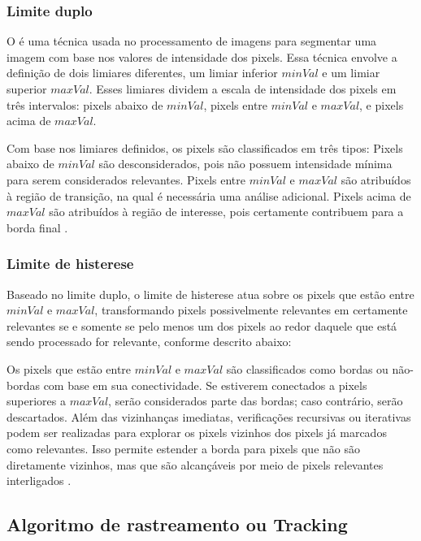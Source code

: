 \subsubsection[Limite duplo]{Limite duplo}

O  é uma técnica usada no processamento de imagens para segmentar uma imagem com base nos valores de intensidade dos pixels. Essa técnica envolve a definição de dois limiares diferentes, um limiar inferior $minVal$ e um limiar superior $maxVal$. Esses limiares dividem a escala de intensidade dos pixels em três intervalos: pixels abaixo de $minVal$, pixels entre $minVal$ e $maxVal$, e pixels acima de $maxVal$.

Com base nos limiares definidos, os pixels são classificados em três tipos:
Pixels abaixo de $minVal$ são desconsiderados, pois não possuem intensidade mínima para serem considerados relevantes.
Pixels entre $minVal$ e $maxVal$ são atribuídos à região de transição, na qual é necessária uma análise adicional.
Pixels acima de $maxVal$ são atribuídos à região de interesse, pois certamente contribuem para a borda final \cite{canny-edge-detection-python}.


\subsubsection[Limite de histerese]{Limite de histerese}
Baseado no limite duplo, o limite de histerese atua sobre os pixels que estão entre $minVal$ e $maxVal$, transformando pixels possivelmente relevantes em certamente relevantes se e somente se pelo menos um dos pixels ao redor daquele que está sendo processado for relevante, conforme descrito abaixo:

Os pixels que estão entre $minVal$ e $maxVal$ são classificados como bordas ou não-bordas com base em sua conectividade. Se estiverem conectados a pixels superiores a $maxVal$, serão considerados parte das bordas; caso contrário, serão descartados. Além das vizinhanças imediatas, verificações recursivas ou iterativas podem ser realizadas para explorar os pixels vizinhos dos pixels já marcados como relevantes. Isso permite estender a borda para pixels que não são diretamente vizinhos, mas que são alcançáveis por meio de pixels relevantes interligados \cite{opencv-canny}.




\subsection[Algoritmo de rastreamento ou Tracking]{Algoritmo de rastreamento ou Tracking}

